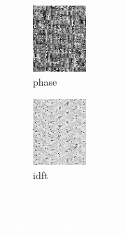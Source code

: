 \documentclass[11 pt,t]{beamer}
\begin{document}
\begin{frame}
\begin{minipage}[t]{0.3\linewidth}
\begin{figure}
   \includegraphics[width=2cm]{wrong/dft_phase}
\caption{phase}
 \end{figure}
        \end{minipage}
\begin{minipage}[t]{0.3\linewidth}
\begin{figure}
   \includegraphics[width=2cm]{wrong/idft_shift}
\caption{idft}
 \end{figure}
        \end{minipage}
\end{frame}

\begin{frame}
\ \\ \ \\
\centering \Large \textcolor{white}{Perhaps no questions...T.T}

\end{frame}
\usebackgroundtemplate{}
\end{document}
